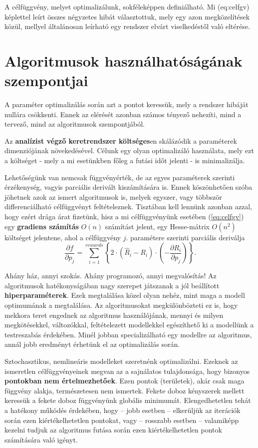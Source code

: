 A célfüggvény, melyet optimalizálunk, sokféleképpen definiálható. Mi \aref({eq:celfgv}) képlettel leírt összes négyzetes hibát választottuk, mely egy azon megközelítések közül, mellyel általánosan leírható egy rendszer elvárt viselkedéstől való eltérése.

\section{Algoritmusok használhatóságának szempontjai}

A paraméter optimalizálás során azt a pontot keressük, mely a rendszer hibáját nullára csökkenti. Ennek az elérését azonban számos tényező nehezíti, mind a tervező, mind az algoritmusok szempontjából.

Az \textbf{analízist végző keretrendszer költséges}en skálázódik a paraméterek dimenziójának növekedésével. Célunk egy olyan optimalizáló használata, mely ezt a költséget - mely a mi esetünkben főleg a futási időt jelenti - is minimalizálja.

Lehetőségünk van nemcsak függvényérték, de az egyes paraméterek szerinti érzékenység, vagyis parciális derivált kiszámítására is. Ennek köszönhetően szóba jöhetnek azok az ismert algoritmusok is, melyek egyszer, vagy többször differenciálható célfüggvényt feltételeznek. Tisztában kell lennünk azonban azzal, hogy ezért drága árat fizetünk, hisz a mi célfüggvényünk esetében (\ref{eq:celfgv}) egy \textbf{gradiens számítás} $O(n)$ számítást jelent, egy Hesse-mátrix $O(n^2)$ költséget jelentene, ahol a célfüggvény $j.$ paramétere szerinti parciális deriválja
$$\frac{\partial f}{\partial p_j}=\sum_{i=1}^{rewards}\left\lbrace   2\cdot \left( \hat{R}_i-R_i\right) \cdot\left(-\frac{\partial R_i}{\partial p_j}\right)  \right\rbrace   .$$

Ahány ház, annyi szokás. Ahány programozó, annyi megvalósítás! Az algoritmusok hatékonyságában nagy szerepet játszanak a jól beállított \textbf{hiperparaméterek}. Ezek megtalálása közel olyan nehéz, mint maga a modell optimumának a megtalálása. Az algoritmusokat megkülönbözteti ez is, hogy mekkora teret engednek az algoritmus használójának, mennyi és milyen megkötésekkel, változókkal, feltételezett modellekkel egészíthető ki a modellünk a testreszabás érdekében. Minél jobban specializálható egy modellre az algoritmus, annál jobb eredményt érhetünk el az optimalizálás során.

Sztochasztikus, nemlineáris modelleket szeretnénk optimalizálni. Ezeknek az ismeretlen célfüggvényeinek megvan az a sajnálatos tulajdonsága, hogy bizonyos \textbf{pontokban nem értelmezhetőek}. Ezen pontok (területek), akár csak maga függvény alakja, természetesen nem ismertek. Fekete doboz kényszerek mellett keressük a fekete doboz függvényünk globális minimumát. Elengedhetetlen tehát a hatékony működés érdekében, hogy -- jobb esetben -- elkerüljük az iterációk során ezen kiértékelhetetlen pontokat, vagy -- rosszabb esetben -- valamiképp kezelni tudjuk az algoritmus futása során ezen kiértékelhetetlen pontok számítására való igényt.

